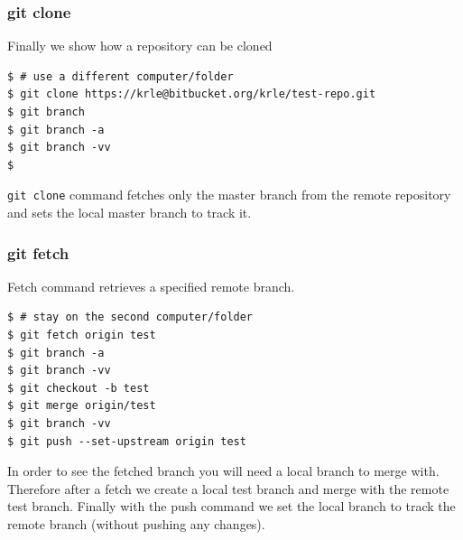\documentclass{beamer}
\begin{document}










\begin{frame}[fragile]
\frametitle{git clone}

Finally we show how a repository can be cloned

\begin{lstlisting}
$ # use a different computer/folder
$ git clone https://krle@bitbucket.org/krle/test-repo.git
$ git branch
$ git branch -a
$ git branch -vv
$ 
\end{lstlisting}

\texttt{git clone} command fetches only the master branch from the remote
repository and sets the local master branch to track it.

\end{frame}


\begin{frame}[fragile]
\frametitle{git fetch}

Fetch command retrieves a specified remote branch.

\begin{lstlisting}
$ # stay on the second computer/folder
$ git fetch origin test
$ git branch -a
$ git branch -vv
$ git checkout -b test
$ git merge origin/test
$ git branch -vv
$ git push --set-upstream origin test
\end{lstlisting}

In order to see the fetched branch you will need a local branch to
merge with. Therefore after a fetch we create a local test branch and
merge with the remote test branch. Finally with the push command we
set the local branch to track the remote branch (without pushing any
changes).


\end{frame}
\end{document}
